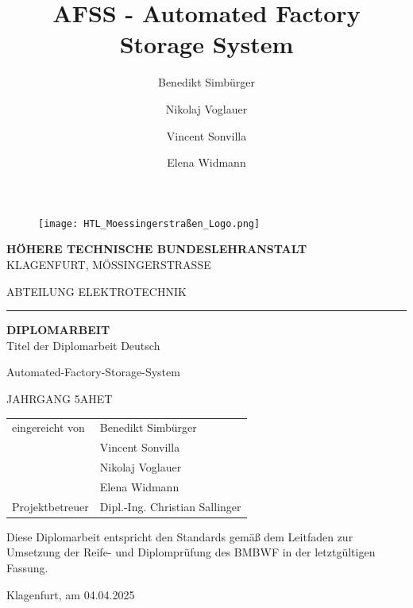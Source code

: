 \documentclass[12pt]{article}
\title{AFSS - Automated Factory Storage System}
\author{Benedikt Simbürger \\
    \and Nikolaj Voglauer \\
    \and Vincent Sonvilla \\
    \and Elena Widmann
    }
\begin{document}

\begin{figure}[h]
    \texttt{[image: HTL\_Moessingerstraßen\_Logo.png]}
    \centering
\end{figure}

\begin{center}
    \huge \textbf{HÖHERE TECHNISCHE BUNDESLEHRANSTALT} \\
    \vspace{5mm}
    \Large{KLAGENFURT, MÖSSINGERSTRASSE}

\end{center}

\vspace{7mm}

\begin{center}
    \Large{ABTEILUNG ELEKTROTECHNIK}
\end{center}

\hrule

\vspace{10mm}

\begin{center}
    \Huge \textbf{DIPLOMARBEIT} \\
    \vspace{7mm}
    \huge{Titel der Diplomarbeit Deutsch}

    \vspace{7mm}
    \huge{Automated-Factory-Storage-System}

    \vspace{7mm}
    \Large{JAHRGANG 5AHET}

\end{center}

\vspace{20mm}

\begin{flushleft}
    \bgroup
        \Large
        \def\arraystretch{1.5}
        \begin{tabular}{p{5cm}l}
            eingereicht von & Benedikt Simbürger\\
            & Vincent Sonvilla\\
            & Nikolaj Voglauer\\
            & Elena Widmann\\
            Projektbetreuer & Dipl.-Ing. Christian Sallinger
        \end{tabular}
    \egroup
\end{flushleft}

\vspace{7mm}
\Large
Diese Diplomarbeit entspricht den Standards gemäß dem Leitfaden zur Umsetzung der Reife- und Diplomprüfung des BMBWF in der letztgültigen Fassung.\par
\begin{flushright}
    Klagenfurt, am 04.04.2025
\end{flushright}
\end{document}
